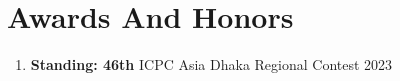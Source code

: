 \section{Awards And Honors}

\begin{enumerate}[noitemsep,topsep=0pt]
    \item \textbf{Standing: 46th} ICPC Asia Dhaka Regional Contest \hfill 2023
\end{enumerate}
